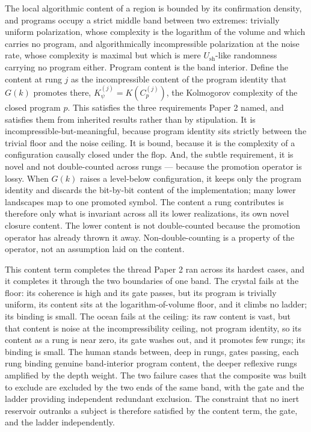 \documentclass[11pt,oneside]{report}
\theoremstyle{definition}
\theoremstyle{remark}
\begin{document}
The local algorithmic content of a region is bounded by its confirmation
density, and programs occupy a strict middle band between two extremes:
trivially uniform polarization, whose complexity is the logarithm of the
volume and which carries no program, and algorithmically incompressible
polarization at the noise rate, whose complexity is maximal but which is mere
\ensuremath{U_{\mathrm{sh}}}-like randomness carrying no program either. Program
content is the band interior. Define the content at rung \ensuremath{j} as the
incompressible content of the program identity that \ensuremath{G(k)} promotes
there, \ensuremath{K_{\psi}^{(j)} = K(C_{p}^{(j)})}, the Kolmogorov complexity
of the closed program \ensuremath{p}. This satisfies the three requirements
Paper 2 named, and satisfies them from inherited results rather than by
stipulation. It is incompressible-but-meaningful, because program identity sits
strictly between the trivial floor and the noise ceiling. It is bound, because
it is the complexity of a configuration causally closed under the flop. And,
the subtle requirement, it is novel and not double-counted across rungs ---
because the promotion operator is lossy. When \ensuremath{G(k)} raises a
level-below configuration, it keeps only the program identity and discards the
bit-by-bit content of the implementation; many lower landscapes map to one
promoted symbol. The content a rung contributes is therefore only what is
invariant across all its lower realizations, its own novel closure content. The
lower content is not double-counted because the promotion operator has already
thrown it away. Non-double-counting is a property of the operator, not an
assumption laid on the content.

This content term completes the thread Paper 2 ran across its hardest cases,
and it completes it through the two boundaries of one band. The crystal fails
at the floor: its coherence is high and its gate passes, but its program is
trivially uniform, its content sits at the logarithm-of-volume floor, and it
climbs no ladder; its binding is small. The ocean fails at the ceiling: its raw
content is vast, but that content is noise at the incompressibility ceiling, not
program identity, so its content as a rung is near zero, its gate washes out,
and it promotes few rungs; its binding is small. The human stands between, deep
in rungs, gates passing, each rung binding genuine band-interior program
content, the deeper reflexive rungs amplified by the depth weight. The two
failure cases that the composite was built to exclude are excluded by the two
ends of the same band, with the gate and the ladder providing independent
redundant exclusion. The constraint that no inert reservoir outranks a subject is therefore satisfied by the content term, the gate, and the ladder independently.
\end{document}
